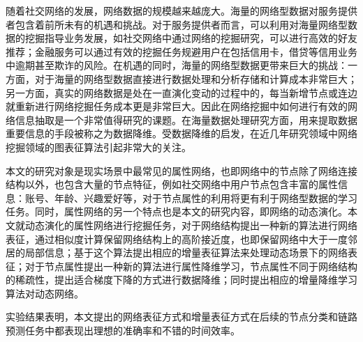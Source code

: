 随着社交网络的发展，网络数据的规模越来越庞大。海量的网络型数据对服务提供者包含着前所未有的机遇和挑战。对于服务提供者而言，可以利用对海量网络型数据的挖掘指导业务发展，如社交网络中通过网络的挖掘研究，可以进行高效的好友推荐；金融服务可以通过有效的挖掘任务规避用户在包括信用卡，借贷等信用业务中逾期甚至欺诈的风险。在机遇的同时，海量的网络型数据更带来巨大的挑战：一方面，对于海量的网络型数据直接进行数据处理和分析存储和计算成本非常巨大；另一方面，真实的网络数据是处在一直演化变动的过程中的，每当新增节点或连边就重新进行网络挖掘任务成本更是非常巨大。因此在网络挖掘中如何进行有效的网络信息抽取是一个非常值得研究的课题。在海量数据处理研究方面，用来提取数据重要信息的手段被称之为数据降维。受数据降维的启发，在近几年研究领域中网络挖掘领域的图表征算法引起非常大的关注。

本文的研究对象是现实场景中最常见的属性网络，也即网络中的节点除了网络连接结构以外，也包含大量的节点特征，例如社交网络中用户节点包含丰富的属性信息：账号、年龄、兴趣爱好等，对于节点属性的利用将更有利于网络型数据的学习任务。同时，属性网络的另一个特点也是本文的研究内容，即网络的动态演化。本文就动态演化的属性网络进行挖掘任务，对于网络结构提出一种新的算法进行网络表征，通过相似度计算保留网络结构上的高阶接近度，也即保留网络中大于一度邻居的局部信息；基于这个算法提出相应的增量表征算法来处理动态场景下的网络表征；对于节点属性提出一种新的算法进行属性降维学习，节点属性不同于网络结构的稀疏性，提出适合梯度下降的方式进行数据降维；同时提出相应的增量降维学习算法对动态网络。

实验结果表明，本文提出的网络表征方式和增量表征方式在后续的节点分类和链路预测任务中都表现出理想的准确率和不错的时间效率。